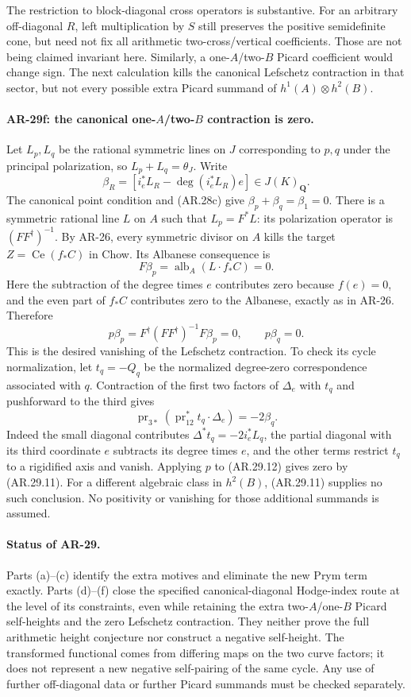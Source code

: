 The restriction to block-diagonal cross operators is substantive.
For an arbitrary off-diagonal $R$, left multiplication by $S$
still preserves the positive semidefinite cone, but need not fix
all arithmetic two-cross/vertical coefficients.  Those are not
being claimed invariant here.  Similarly, a one-$A$/two-$B$
Picard coefficient would change sign.  The next calculation kills
the canonical Lefschetz contraction in that sector, but not every
possible extra Picard summand of $h^1(A)\otimes h^2(B)$.

\paragraph{AR-29f: the canonical one-$A$/two-$B$ contraction is zero.}
Let $L_p,L_q$ be the rational symmetric lines on $J$ corresponding
to $p,q$ under the principal polarization, so
$L_p+L_q=\theta_J$.  Write
\[
 \beta_R=[i_e^*L_R-\deg(i_e^*L_R)e]\in J(K)_\mathbf Q.
\]
The canonical point condition and (AR.28c) give
$\beta_p+\beta_q=\beta_1=0$.
There is a symmetric rational line $L$ on $A$ such that
$L_p=F^*L$: its polarization operator is $(FF^\dagger)^{-1}$.
By AR-26, every symmetric divisor on $A$ kills the target
$Z=\operatorname{Ce}(f_*C)$ in Chow.  Its Albanese consequence is
\[
 F\beta_p=\operatorname{alb}_A(L\cdot f_*C)=0.
\]
Here the subtraction of the degree times $e$ contributes zero
because $f(e)=0$, and the even part of $f_*C$ contributes zero
to the Albanese, exactly as in AR-26.  Therefore
\[
 p\beta_p=F^\dagger(FF^\dagger)^{-1}F\beta_p=0,
 \qquad p\beta_q=0.                                    \tag{AR.29.11}
\]
This is the desired vanishing of the Lefschetz contraction.
To check its cycle normalization, let $t_q=-Q_q$ be the
normalized degree-zero correspondence associated with $q$.
Contraction of the first two factors of $\Delta_e$ with $t_q$
and pushforward to the third gives
\[
 \operatorname{pr}_{3*}(\operatorname{pr}_{12}^*t_q\cdot\Delta_e)
       =-2\beta_q.                                    \tag{AR.29.12}
\]
Indeed the small diagonal contributes
$\Delta^*t_q=-2i_e^*L_q$, the partial diagonal with its third
coordinate $e$ subtracts its degree times $e$, and the other
terms restrict $t_q$ to a rigidified axis and vanish.  Applying
$p$ to (AR.29.12) gives zero by (AR.29.11).
For a different algebraic class in $h^2(B)$, (AR.29.11) supplies
no such conclusion.  No positivity or vanishing for those
additional summands is assumed.

\paragraph{Status of AR-29.}
Parts (a)--(c) identify the extra motives and eliminate the new
Prym term exactly.  Parts (d)--(f) close the specified
canonical-diagonal Hodge-index route at the level of its
constraints, even while retaining the extra two-$A$/one-$B$
Picard self-heights and the zero Lefschetz contraction.
They neither prove the full arithmetic height conjecture nor
construct a negative self-height.  The transformed functional
comes from differing maps on the two curve factors; it does not
represent a new negative self-pairing of the same cycle.
Any use of further off-diagonal data or further Picard summands
must be checked separately.

